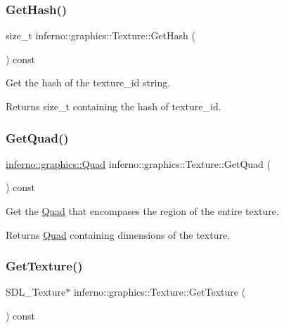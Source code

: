 \subsubsection{\texorpdfstring{Get\+Hash()}{GetHash()}}
{\footnotesize\ttfamily size\+\_\+t inferno\+::graphics\+::\+Texture\+::\+Get\+Hash (\begin{DoxyParamCaption}{ }\end{DoxyParamCaption}) const}



Get the hash of the texture\+\_\+id string. 

\begin{DoxyReturn}{Returns}
size\+\_\+t containing the hash of texture\+\_\+id. 
\end{DoxyReturn}
\mbox{\label{classinferno_1_1graphics_1_1_texture_a34c8a8546474066c66849ca2aceba0fd}} 
\subsubsection{\texorpdfstring{Get\+Quad()}{GetQuad()}}
{\footnotesize\ttfamily \mbox{\hyperlink{classinferno_1_1graphics_1_1_quad}{inferno\+::graphics\+::\+Quad}} inferno\+::graphics\+::\+Texture\+::\+Get\+Quad (\begin{DoxyParamCaption}{ }\end{DoxyParamCaption}) const}



Get the \mbox{\hyperlink{classinferno_1_1graphics_1_1_quad}{Quad}} that encompases the region of the entire texture. 

\begin{DoxyReturn}{Returns}
\mbox{\hyperlink{classinferno_1_1graphics_1_1_quad}{Quad}} containing dimensions of the texture. 
\end{DoxyReturn}
\mbox{\label{classinferno_1_1graphics_1_1_texture_a42df17ded08f76751332725d66a88ce2}} 
\subsubsection{\texorpdfstring{Get\+Texture()}{GetTexture()}}
{\footnotesize\ttfamily S\+D\+L\+\_\+\+Texture$\ast$ inferno\+::graphics\+::\+Texture\+::\+Get\+Texture (\begin{DoxyParamCaption}{ }\end{DoxyParamCaption}) const\hspace{0.3cm}{\ttfamily [inline]}}



